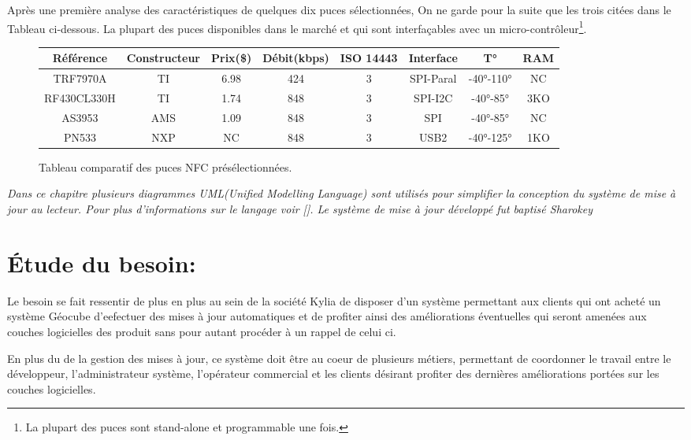 \documentclass{themeensg}
\begin{document}
Après une première analyse des caractéristiques de quelques dix puces sélectionnées, On ne garde pour la suite que les trois citées dans le Tableau ci-dessous. La plupart des puces disponibles dans le marché et qui sont interfaçables avec un micro-contrôleur\footnote{La plupart des puces sont stand-alone et programmable une fois.}.
\begin{figure}
\begin{center}
\begin{tabular}{|c|c|c|c|c|c|c|c|}
\hline
Référence & Constructeur & Prix(\$) & Débit(kbps) & ISO 14443 & Interface & T° & RAM\\ \hline
TRF7970A & TI & 6.98 & 424 & 3 & SPI-Paral & -40°-110° & NC\\
RF430CL330H & TI & 1.74 & 848 & 3 & SPI-I2C & -40°-85° & 3KO\\
AS3953 & AMS & 1.09 & 848 & 3 & SPI & -40°-85° & NC\\
PN533 & NXP & NC & 848 & 3 & USB2 & -40°-125° & 1KO\\
\hline
\end{tabular}
\end{center}
\caption{Tableau comparatif des puces NFC présélectionnées.}
\end{figure}

\textit{ Dans ce chapitre plusieurs diagrammes UML(Unified Modelling Language) sont utilisés pour simplifier la conception du système de mise à jour au lecteur. Pour plus d'informations sur le langage voir []. Le système de mise à jour développé fut baptisé Sharokey}
\section{Étude du besoin:}
Le besoin se fait ressentir de plus en plus au sein de la société Kylia de disposer d'un système permettant aux clients qui ont acheté un système Géocube  d'eefectuer des mises à jour automatiques et de profiter ainsi des améliorations éventuelles qui seront amenées aux couches logicielles des produit sans pour autant procéder à un rappel de celui ci.

En plus du de la gestion des mises à jour, ce système doit être au coeur de plusieurs métiers, permettant de coordonner le travail entre le développeur, l'administrateur système, l'opérateur commercial et les clients désirant profiter des dernières améliorations portées sur les couches logicielles.
\end{document}
